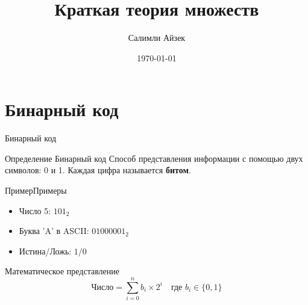 \documentclass{beamer}
\title[МОП]{Краткая теория множеств}
\author{Салимли Айзек}
\institute{MathLang}
\date{\today}
\newenvironment{rusdefinition}[1][Определение]{
    \begin{block}{#1}
}{\end{block}}
\newenvironment{rexample}[1][Пример]{\begin{exampleblock}{#1}}{\end{exampleblock}}
\begin{document}
\begin{frame}
    \titlepage
\end{frame}


\section{Бинарный код}
\begin{frame}{Бинарный код}
\begin{rusdefinition}{Бинарный код}
Способ представления информации с помощью двух символов: 0 и 1. Каждая цифра называется \textbf{битом}.
\end{rusdefinition}

\begin{rexample}{Примеры}
\begin{itemize}
\item Число 5: $101_2$
\item Буква 'A' в ASCII: $01000001_2$
\item Истина/Ложь: $1/0$
\end{itemize}
\end{rexample}

\begin{block}{Математическое представление}
\[
\text{Число} = \sum_{i=0}^{n} b_i \times 2^i \quad \text{где } b_i \in \{0,1\}
\]
\end{block}
\end{frame}
\end{document}
